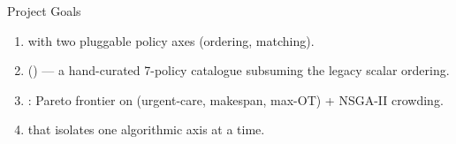 \documentclass[aspectratio=169, 11pt]{beamer}
\begin{document}
\begin{frame}{Project Goals}
  \begin{enumerate}
    \item {}
          with two pluggable policy axes (ordering, matching).
    \item {} ()
          --- a hand-curated 7-policy catalogue subsuming the
          legacy scalar ordering.
    \item {}: Pareto frontier on
          (urgent-care, makespan, max-OT) + NSGA-II crowding.
    \item {} that isolates one
          algorithmic axis at a time.
  \end{enumerate}
\end{frame}
\end{document}
